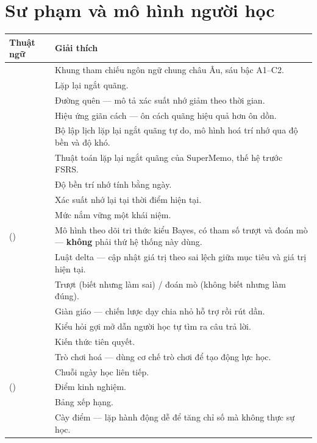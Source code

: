 \section{Sư phạm và mô hình người học}

\begin{longtable}{L{4.2cm} L{9.4cm}}
\toprule
\textbf{Thuật ngữ} & \textbf{Giải thích}\\
\midrule
\endhead
{} & Khung tham chiếu ngôn ngữ chung châu Âu, sáu bậc A1--C2.\\
 & Lặp lại ngắt quãng.\\
 & Đường quên — mô tả xác suất nhớ giảm theo thời gian.\\
 & Hiệu ứng giãn cách — ôn cách quãng hiệu quả hơn ôn dồn.\\
 & Bộ lập lịch lặp lại ngắt quãng tự do, mô hình hoá trí nhớ qua độ bền và độ khó.\\
 & Thuật toán lặp lại ngắt quãng của SuperMemo, thế hệ trước FSRS.\\
 & Độ bền trí nhớ tính bằng ngày.\\
 & Xác suất nhớ lại tại thời điểm hiện tại.\\
 & Mức nắm vững một khái niệm.\\
 () & Mô hình theo dõi tri thức kiểu Bayes, có tham số trượt và đoán mò — \textbf{không} phải thứ hệ thống này dùng.\\
 & Luật delta — cập nhật giá trị theo sai lệch giữa mục tiêu và giá trị hiện tại.\\
 & Trượt (biết nhưng làm sai) / đoán mò (không biết nhưng làm đúng).\\
 & Giàn giáo — chiến lược dạy chia nhỏ hỗ trợ rồi rút dần.\\
 & Kiểu hỏi gợi mở dẫn người học tự tìm ra câu trả lời.\\
 & Kiến thức tiên quyết.\\
 & Trò chơi hoá — dùng cơ chế trò chơi để tạo động lực học.\\
 & Chuỗi ngày học liên tiếp.\\
 () & Điểm kinh nghiệm.\\
 & Bảng xếp hạng.\\
 & Cày điểm — lặp hành động dễ để tăng chỉ số mà không thực sự học.\\
\bottomrule
\end{longtable}

